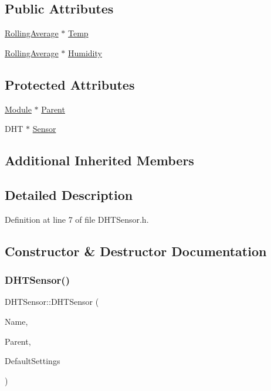 \subsection*{Public Attributes}
\begin{DoxyCompactItemize}
\item 
\hyperlink{class_rolling_average}{Rolling\+Average} $\ast$ \hyperlink{class_d_h_t_sensor_ad0ec569d6b968197eccc32b8d9c3cf9c}{Temp}
\item 
\hyperlink{class_rolling_average}{Rolling\+Average} $\ast$ \hyperlink{class_d_h_t_sensor_a26b6663f5d7a7d698f05ecfa96e5589c}{Humidity}
\end{DoxyCompactItemize}
\subsection*{Protected Attributes}
\begin{DoxyCompactItemize}
\item 
\hyperlink{class_module}{Module} $\ast$ \hyperlink{class_d_h_t_sensor_a874672c28d4f4ff9272194c0947c59e6}{Parent}
\item 
D\+HT $\ast$ \hyperlink{class_d_h_t_sensor_ac89947c1a67ac87f24c6be9794d35c74}{Sensor}
\end{DoxyCompactItemize}
\subsection*{Additional Inherited Members}


\subsection{Detailed Description}


Definition at line 7 of file D\+H\+T\+Sensor.\+h.



\subsection{Constructor \& Destructor Documentation}
\mbox{\label{class_d_h_t_sensor_a75c40cadfc569af7abf80b2cb557b296}} 
\subsubsection{\texorpdfstring{D\+H\+T\+Sensor()}{DHTSensor()}\hspace{0.1cm}{\footnotesize\ttfamily [1/2]}}
{\footnotesize\ttfamily D\+H\+T\+Sensor\+::\+D\+H\+T\+Sensor (\begin{DoxyParamCaption}\item[{const \+\_\+\+\_\+\+Flash\+String\+Helper $\ast$}]{Name,  }\item[{\hyperlink{class_module}{Module} $\ast$}]{Parent,  }\item[{\hyperlink{struct_settings_1_1_d_h_t_sensor_settings}{Settings\+::\+D\+H\+T\+Sensor\+Settings} $\ast$}]{Default\+Settings }\end{DoxyParamCaption})}



